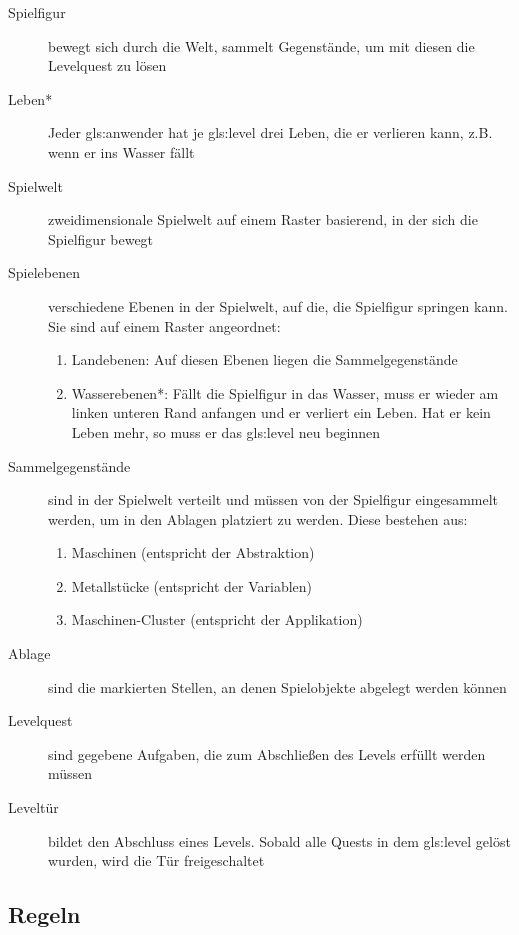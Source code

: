 \documentclass{scrartcl}
\begin{document}
\begin{description}
	\item[Spielfigur] bewegt sich durch die Welt, sammelt Gegenstände, um mit diesen die Levelquest zu lösen
	\item[Leben*] Jeder \gls{gls:anwender} hat je \gls{gls:level} drei Leben, die er verlieren kann, z.B. wenn er ins Wasser fällt
	\item[Spielwelt] zweidimensionale Spielwelt auf einem Raster basierend, in der sich die Spielfigur bewegt
	\item[Spielebenen] verschiedene Ebenen in der Spielwelt, auf die, die Spielfigur springen kann. Sie sind auf einem Raster angeordnet:
		\begin{enumerate}[label=\arabic*]
			\item Landebenen: Auf diesen Ebenen liegen die Sammelgegenstände
			\item Wasserebenen*: Fällt die Spielfigur in das Wasser, muss er wieder am linken unteren Rand anfangen und er verliert ein Leben. Hat er kein Leben mehr, so muss er das \gls{gls:level} neu beginnen
		\end{enumerate}
	\item[Sammelgegenstände] \label{elemente:collectable}sind in der Spielwelt verteilt und müssen von der Spielfigur eingesammelt werden, um in den Ablagen platziert zu werden. Diese bestehen aus:
	\begin{enumerate}[label=\arabic*]
		\item Maschinen (entspricht der Abstraktion)
		\item Metallstücke (entspricht der Variablen)
		\item Maschinen-Cluster (entspricht der Applikation)
	\end{enumerate}
	\item[Ablage] sind die markierten Stellen, an denen Spielobjekte abgelegt werden können
	\item[Levelquest] sind gegebene Aufgaben, die zum Abschließen des Levels erfüllt werden müssen
	\item[Leveltür] bildet den Abschluss eines Levels. Sobald alle Quests in dem \gls{gls:level} gelöst wurden, wird die Tür freigeschaltet
\end{description}

\subsection{Regeln}
\end{document}
